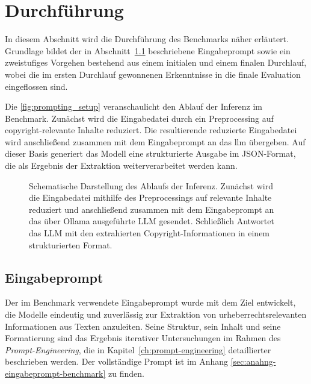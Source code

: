 
\section{Durchführung}\label{sec:durchfuhrung-benchmark}

In diesem Abschnitt wird die Durchführung des Benchmarks näher erläutert.
Grundlage bildet der in Abschnitt~\ref{subsec:eingabeprompt} beschriebene Eingabeprompt sowie ein zweistufiges Vorgehen bestehend aus einem initialen und einem finalen Durchlauf, wobei die im ersten Durchlauf gewonnenen Erkenntnisse in die finale Evaluation eingeflossen sind.

Die \autoref{fig:prompting_setup} veranschaulicht den Ablauf der Inferenz im Benchmark.
Zunächst wird die Eingabedatei durch ein Preprocessing auf copyright-relevante Inhalte reduziert.
Die resultierende reduzierte Eingabedatei wird anschließend zusammen mit dem Eingabeprompt an das \gls{llm} übergeben.
Auf dieser Basis generiert das Modell eine strukturierte Ausgabe im JSON-Format, die als Ergebnis der Extraktion weiterverarbeitet werden kann.

\begin{figure}[ht]
    \centering
    \caption{Schematische Darstellung des Ablaufs der Inferenz. Zunächst wird die Eingabedatei mithilfe des Preprocessings auf relevante Inhalte reduziert und anschließend zusammen mit dem Eingabeprompt an das über Ollama ausgeführte LLM gesendet. Schließlich Antwortet das LLM mit den extrahierten Copyright-Informationen in einem strukturierten Format.}
    \label{fig:prompting_setup}
\end{figure}


\subsection{Eingabeprompt}\label{subsec:eingabeprompt}

Der im Benchmark verwendete Eingabeprompt wurde mit dem Ziel entwickelt, die Modelle eindeutig und zuverlässig zur Extraktion von urheberrechtsrelevanten Informationen aus Texten anzuleiten.
Seine Struktur, sein Inhalt und seine Formatierung sind das Ergebnis iterativer Untersuchungen im Rahmen des \textit{Prompt-Engineering}, die in Kapitel~\ref{ch:prompt-engineering} detaillierter beschrieben werden.
Der vollständige Prompt ist im Anhang \ref{sec:anahng-eingabeprompt-benchmark} zu finden.

